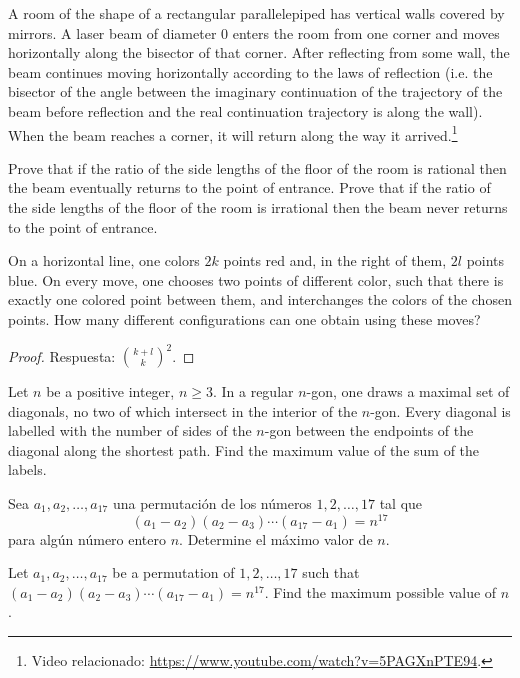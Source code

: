 \begin{probEG}
	A room of the shape of a rectangular parallelepiped has vertical walls covered by mirrors. A laser beam of diameter $0$ enters the room from one corner and moves horizontally along the bisector of that corner. After reflecting from some wall, the beam continues moving horizontally according to the laws of reflection (i.e. the bisector of the angle between the imaginary continuation of the trajectory of the beam before reflection and the real continuation trajectory is along the wall). When the beam reaches a corner, it will return along the way it arrived.\footnote{Video relacionado: \url{https://www.youtube.com/watch?v=5PAGXnPTE94}.}
	\begin{enumerate}[(a)]
		\ii Prove that if the ratio of the side lengths of the floor of the room is rational then the beam eventually returns to the point of entrance.
		\ii Prove that if the ratio of the side lengths of the floor of the room is irrational then the beam never returns to the point of entrance.
	\end{enumerate}
\end{probEG}

\begin{probEG}
	On a horizontal line, one colors $2k$ points red and, in the right of them, $2l$ points blue. On every move, one chooses two points of different color, such that there is exactly one colored point between them, and interchanges the colors of the chosen points. How many different configurations can one obtain using these moves?
\end{probEG}

\begin{proof}
	Respuesta: $\binom{k+l}{k}^2$.
\end{proof}

\begin{problem}
	Let $n$ be a positive integer, $n\ge 3$. In a regular $n$-gon, one draws a maximal set of diagonals, no two of which intersect in the interior of the $n$-gon. Every diagonal is labelled with the number of sides of the $n$-gon between the endpoints of the diagonal along the shortest path. Find the maximum value of the sum of the labels.
\end{problem}


\begin{probMG}[CSMO 2020/10.4]
	Sea $a_1,a_2,\dots,a_{17}$ una permutación de los números $1,2,\dots,17$ tal que
	\[(a_1-a_2)(a_2-a_3)\cdots(a_{17}-a_1)=n^{17}\]
	para algún número entero $n$. Determine el máximo valor de $n$.
	\begin{hint}
		Let $a_1,a_2,\dots,a_{17}$ be a permutation of $1,2,\dots,17$ such that $(a_1-a_2)(a_2-a_3)\cdots(a_{17}-a_1)=n^{17}$. Find the maximum possible value of $n$.
	\end{hint}
\end{probMG}


